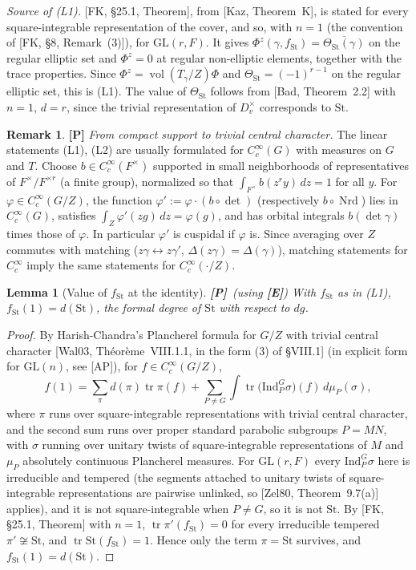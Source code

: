 \documentclass[12pt]{article}
\newcommand{\ov}[1]{\overline{#1}}
\newcommand{\tr}{\operatorname{tr}}
\newcommand{\Nrd}{\operatorname{Nrd}}
\newcommand{\vol}{\operatorname{vol}}
\newcommand{\GL}{\mathrm{GL}}
\newcommand{\St}{\mathrm{St}}
\newcommand{\Pv}{\textbf{[P]}}
\newcommand{\Ev}{\textbf{[E]}}
\theoremstyle{plain}
\newtheorem{lemma}[theorem]{Lemma}
\theoremstyle{definition}
\newtheorem{remark}[theorem]{Remark}
\begin{document}
\emph{Source of (L1).} [FK, \S25.1, Theorem], from [Kaz, Theorem~K], is stated for every square-integrable representation of the cover, and so, with $n=1$ (the convention of [FK, \S8, Remark~(3)]), for $\GL(r,F)$. It gives $\Phi^z(\gamma,f_{\St})=\ov{\Theta_{\St}(\gamma)}$ on the regular elliptic set and $\Phi^z=0$ at regular non-elliptic elements, together with the trace properties. Since $\Phi^z=\vol(T_\gamma/Z)\Phi$ and $\Theta_{\St}=(-1)^{r-1}$ on the regular elliptic set, this is (L1). The value of $\Theta_{\St}$ follows from [Bad, Theorem~2.2] with $n=1$, $d=r$, since the trivial representation of $D_v^\times$ corresponds to $\St$.

\begin{remark}\label{rem:centralchar}\Pv
\emph{From compact support to trivial central character.} The linear statements (L1), (L2) are usually formulated for $C_c^\infty(G)$ with measures on $G$ and $T$. Choose $b\in C_c^\infty(F^\times)$ supported in small neighborhoods of representatives of $F^\times/F^{\times r}$ (a finite group), normalized so that $\int_{F^\times}b(z^ry)\,dz=1$ for all $y$. For $\varphi\in C_c^\infty(G/Z)$, the function $\varphi':=\varphi\cdot(b\circ\det)$ (respectively $b\circ\Nrd$) lies in $C_c^\infty(G)$, satisfies $\int_Z\varphi'(zg)\,dz=\varphi(g)$, and has orbital integrals $b(\det\gamma)$ times those of $\varphi$. In particular $\varphi'$ is cuspidal if $\varphi$ is. Since averaging over $Z$ commutes with matching ($z\gamma\leftrightarrow z\gamma'$, $\Delta(z\gamma)=\Delta(\gamma)$), matching statements for $C_c^\infty$ imply the same statements for $C_c^\infty(\cdot/Z)$.
\end{remark}
\begin{lemma}[Value of $f_{\St}$ at the identity]\label{lem:fSt1}\Pv\ (using \Ev)
With $f_{\St}$ as in (L1), $f_{\St}(1)=d(\St)$, the formal degree of $\St$ with respect to $dg$.
\end{lemma}
\begin{proof}
By Harish-Chandra's Plancherel formula for $G/Z$ with trivial central character [Wal03, Th\'eor\`eme~VIII.1.1, in the form (3) of \S VIII.1] (in explicit form for $\GL(n)$, see [AP]), for $f\in C_c^\infty(G/Z)$,
\[ f(1)=\sum_{\pi}d(\pi)\tr\pi(f)+\sum_{P\ne G}\int\tr\big(\mathrm{Ind}_P^G\sigma\big)(f)\,d\mu_P(\sigma), \]
where $\pi$ runs over square-integrable representations with trivial central character, and the second sum runs over proper standard parabolic subgroups $P=MN$, with $\sigma$ running over unitary twists of square-integrable representations of $M$ and $\mu_P$ absolutely continuous Plancherel measures. For $\GL(r,F)$ every $\mathrm{Ind}_P^G\sigma$ here is irreducible and tempered (the segments attached to unitary twists of square-integrable representations are pairwise unlinked, so [Zel80, Theorem~9.7(a)] applies), and it is not square-integrable when $P\ne G$, so it is not $\St$. By [FK, \S25.1, Theorem] with $n=1$, $\tr\pi'(f_{\St})=0$ for every irreducible tempered $\pi'\not\cong\St$, and $\tr\St(f_{\St})=1$. Hence only the term $\pi=\St$ survives, and $f_{\St}(1)=d(\St)$.
\end{proof}
\end{document}
